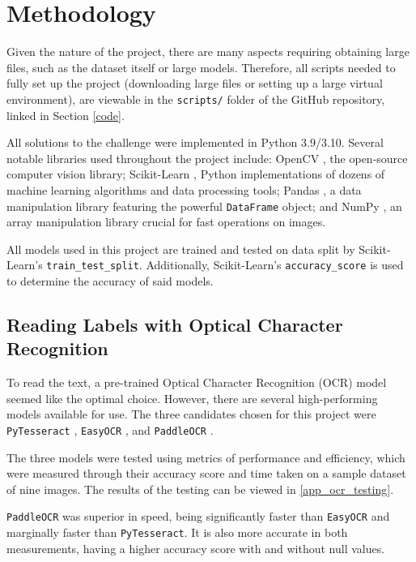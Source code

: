 \documentclass[final,5p,times,twocolumn,authoryear]{elsarticle}
\begin{document}
\section{Methodology}
\label{method}

Given the nature of the project, there are many aspects requiring obtaining large files, such as the dataset itself or large models. Therefore, all scripts needed to fully set up the project (downloading large files or setting up a large virtual environment), are viewable in the \verb|scripts/| folder of the GitHub repository, linked in Section \ref{code}.

All solutions to the challenge were implemented in Python 3.9/3.10. Several notable libraries used throughout the project include: OpenCV \citep{opencv_library}, the open-source computer vision library; Scikit-Learn \citep{scikit-learn}, Python implementations of dozens of machine learning algorithms and data processing tools; Pandas \citep{mckinney2010data}, a data manipulation library featuring the powerful \verb|DataFrame| object; and NumPy \citep{harris2020array}, an array manipulation library crucial for fast operations on images.

All models used in this project are trained and tested on data split by Scikit-Learn's \verb|train_test_split|. Additionally, Scikit-Learn's \verb|accuracy_score| is used to determine the accuracy of said models.

\subsection{Reading Labels with Optical Character Recognition}
\label{step_1}

To read the text, a pre-trained Optical Character Recognition (OCR) model seemed like the optimal choice. However, there are several high-performing models available for use. The three candidates chosen for this project were \verb|PyTesseract| \citep{lee2017pytesseract}, \verb|EasyOCR| \citep{jaided2020easyocr}, and \verb|PaddleOCR| \citep{du2020ppocr}.

The three models were tested using metrics of performance and efficiency, which were measured through their accuracy score and time taken on a sample dataset of nine images. The results of the testing can be viewed in \ref{app_ocr_testing}.

\verb|PaddleOCR| was superior in speed, being significantly faster than \verb|EasyOCR| and marginally faster than \verb|PyTesseract|. It is also more accurate in both measurements, having a higher accuracy score with and without null values.
\end{document}
